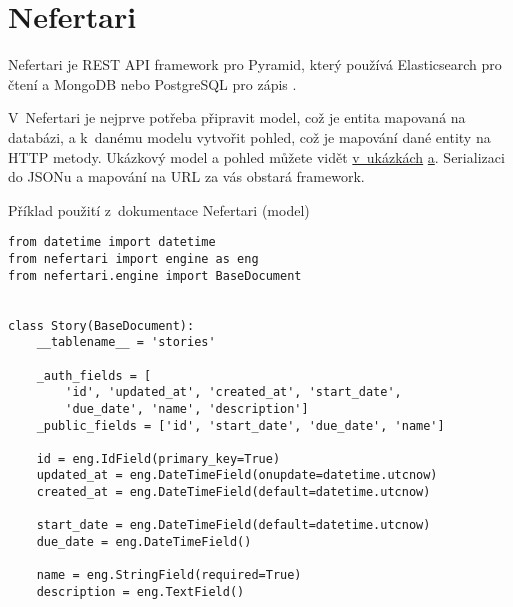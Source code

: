 \section{Nefertari}\label{nefertari}

Nefertari je REST API framework pro Pyramid, který používá Elasticsearch pro čtení a MongoDB nebo PostgreSQL pro zápis \autocite{nefertari}.

V~Nefertari je nejprve potřeba připravit model, což je entita mapovaná na databázi, a k~danému modelu vytvořit pohled, což je mapování dané entity na HTTP metody. Ukázkový model a pohled můžete vidět \protect\hyperlink{code:nefertarimodel}{v~ukázkách} \protect\hyperlink{code:nefertariview}{a}. Serializaci do JSONu a mapování na URL za vás obstará framework.

\begin{listing}[htbp]
\caption{{\label{code:nefertarimodel}Příklad použití z~dokumentace Nefertari (model) \autocite{nefertarimodel}}}
\begin{verbatim}
from datetime import datetime
from nefertari import engine as eng
from nefertari.engine import BaseDocument


class Story(BaseDocument):
    __tablename__ = 'stories'

    _auth_fields = [
        'id', 'updated_at', 'created_at', 'start_date',
        'due_date', 'name', 'description']
    _public_fields = ['id', 'start_date', 'due_date', 'name']

    id = eng.IdField(primary_key=True)
    updated_at = eng.DateTimeField(onupdate=datetime.utcnow)
    created_at = eng.DateTimeField(default=datetime.utcnow)

    start_date = eng.DateTimeField(default=datetime.utcnow)
    due_date = eng.DateTimeField()

    name = eng.StringField(required=True)
    description = eng.TextField()
\end{verbatim}
\end{listing}

